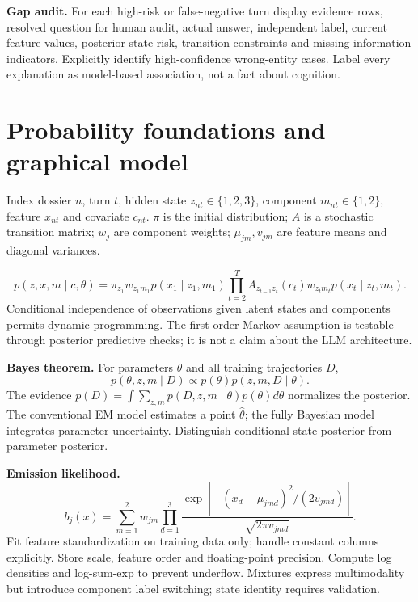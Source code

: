 \documentclass[11pt,letterpaper]{article}
\newcommand{\sectionpage}[1]{\clearpage\section{#1}}
\begin{document}
\textbf{Gap audit.} For each high-risk or false-negative turn display evidence rows, resolved question for human audit, actual answer, independent label, current feature values, posterior state risk, transition constraints and missing-information indicators. Explicitly identify high-confidence wrong-entity cases. Label every explanation as model-based association, not a fact about cognition.

\sectionpage{Probability foundations and graphical model}
Index dossier $n$, turn $t$, hidden state $z_{nt}\in\{1,2,3\}$, component $m_{nt}\in\{1,2\}$, feature $x_{nt}$ and covariate $c_{nt}$. $\pi$ is the initial distribution; $A$ is a stochastic transition matrix; $w_j$ are component weights; $\mu_{jm},v_{jm}$ are feature means and diagonal variances.

\begin{center}
\end{center}
\[
p(z,x,m\mid c,\theta)=\pi_{z_1}w_{z_1m_1}p(x_1\mid z_1,m_1)
\prod_{t=2}^T A_{z_{t-1}z_t}(c_t)w_{z_tm_t}p(x_t\mid z_t,m_t).
\]
Conditional independence of observations given latent states and components permits dynamic programming. The first-order Markov assumption is testable through posterior predictive checks; it is not a claim about the LLM architecture.

\textbf{Bayes theorem.} For parameters $\theta$ and all training trajectories $D$,
\[
p(\theta,z,m\mid D)\propto p(\theta)p(z,m,D\mid\theta).
\]
The evidence $p(D)=\int\sum_{z,m}p(D,z,m\mid\theta)p(\theta)d\theta$ normalizes the posterior. The conventional EM model estimates a point $\hat\theta$; the fully Bayesian model integrates parameter uncertainty. Distinguish conditional state posterior from parameter posterior.

\textbf{Emission likelihood.}
\[
b_j(x)=\sum_{m=1}^2 w_{jm}\prod_{d=1}^3\frac{\exp[-(x_d-\mu_{jmd})^2/(2v_{jmd})]}{\sqrt{2\pi v_{jmd}}}.
\]
Fit feature standardization on training data only; handle constant columns explicitly. Store scale, feature order and floating-point precision. Compute log densities and log-sum-exp to prevent underflow. Mixtures express multimodality but introduce component label switching; state identity requires validation.
\end{document}
